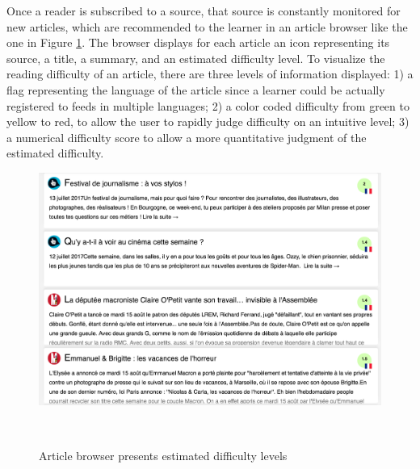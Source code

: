 
  Once a reader is subscribed to a source, that source is constantly monitored for new articles, which are recommended to the learner in an article browser like the one in Figure \ref{fig:article_listing}. The browser displays for each article an icon representing its source, a title, a summary, and an estimated difficulty level.
  To visualize the reading difficulty of an article, there are three levels of information displayed: 1) a flag representing the language of the article since a learner could be actually registered to feeds in multiple languages; 2) a color coded difficulty from green to yellow to red, to  allow the user to rapidly judge difficulty on an intuitive level; 3) a numerical difficulty score  to allow a more quantitative judgment of the estimated difficulty.
    

    \begin{figure}[h!]
    \centering
      \includegraphics[width=0.95\columnwidth]{figures/article_listing_short}
      \caption{Article browser presents estimated difficulty levels }~
      \label{fig:article_listing}
    \end{figure}




